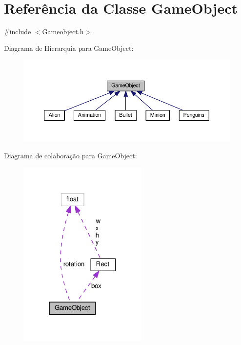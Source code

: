 \hypertarget{classGameObject}{\section{Referência da Classe Game\+Object}
\label{classGameObject}
}


{\ttfamily \#include $<$Gameobject.\+h$>$}



Diagrama de Hierarquia para Game\+Object\+:\nopagebreak
\begin{figure}[H]
\begin{center}
\leavevmode
\includegraphics[width=350pt]{classGameObject__inherit__graph}
\end{center}
\end{figure}


Diagrama de colaboração para Game\+Object\+:
\nopagebreak
\begin{figure}[H]
\begin{center}
\leavevmode
\includegraphics[width=182pt]{classGameObject__coll__graph}
\end{center}
\end{figure}
